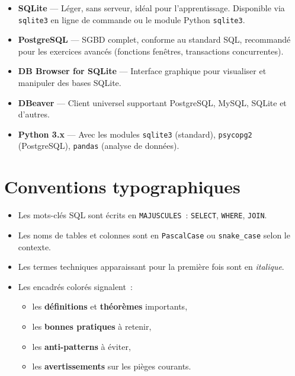 \begin{itemize}
    \item \textbf{SQLite} --- L\'eger, sans serveur, id\'eal pour l'apprentissage.
          Disponible via \texttt{sqlite3} en ligne de commande ou le module
          Python \texttt{sqlite3}.
    \item \textbf{PostgreSQL} --- SGBD complet, conforme au standard SQL,
          recommand\'e pour les exercices avanc\'es (fonctions fen\^etres,
          transactions concurrentes).
    \item \textbf{DB Browser for SQLite} --- Interface graphique pour
          visualiser et manipuler des bases SQLite.
    \item \textbf{DBeaver} --- Client universel supportant PostgreSQL,
          MySQL, SQLite et d'autres.
    \item \textbf{Python 3.x} --- Avec les modules \texttt{sqlite3} (standard),
          \texttt{psycopg2} (PostgreSQL), \texttt{pandas} (analyse de donn\'ees).
\end{itemize}

\section*{Conventions typographiques}

\begin{itemize}
    \item Les mots-cl\'es SQL sont \'ecrits en \texttt{MAJUSCULES}~:
          \texttt{SELECT}, \texttt{WHERE}, \texttt{JOIN}.
    \item Les noms de tables et colonnes sont en \texttt{PascalCase} ou
          \texttt{snake\_case} selon le contexte.
    \item Les termes techniques apparaissant pour la premi\`ere fois sont
          en \emph{italique}.
    \item Les encadr\'es color\'es signalent~:
          \begin{itemize}
              \item les \textbf{d\'efinitions} et \textbf{th\'eor\`emes} importants,
              \item les \textbf{bonnes pratiques} \`a retenir,
              \item les \textbf{anti-patterns} \`a \'eviter,
              \item les \textbf{avertissements} sur les pi\`eges courants.
          \end{itemize}
\end{itemize}

